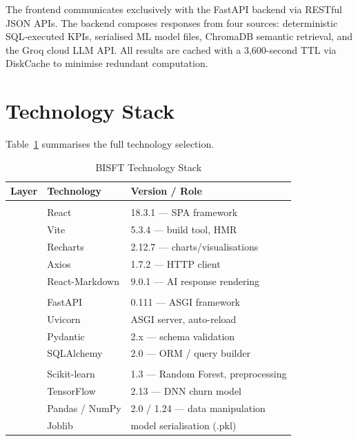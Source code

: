 \documentclass[conference]{IEEEtran}
\begin{document}
The frontend communicates exclusively with the FastAPI backend via RESTful JSON APIs.
The backend composes responses from four sources: deterministic SQL-executed KPIs,
serialised ML model files, ChromaDB semantic retrieval, and the Groq cloud LLM API.
All results are cached with a 3{,}600-second TTL via DiskCache to minimise redundant
computation.

\section{Technology Stack}

Table~\ref{tab:tech} summarises the full technology selection.

\begin{table}[H]
\centering
\caption{BISFT Technology Stack}
\label{tab:tech}
\scriptsize
\setlength{\tabcolsep}{4pt}
\begin{tabularx}{\linewidth}{@{}l l X@{}}
\toprule
\textbf{Layer} & \textbf{Technology} & \textbf{Version / Role} \\
\midrule
\rowcolor{rowgray}
\multicolumn{3}{l}{\textit{Frontend}} \\
& React            & 18.3.1 — SPA framework \\
& Vite             & 5.3.4 — build tool, HMR \\
& Recharts         & 2.12.7 — charts/visualisations \\
& Axios            & 1.7.2 — HTTP client \\
& React-Markdown   & 9.0.1 — AI response rendering \\
\rowcolor{rowgray}
\multicolumn{3}{l}{\textit{Backend}} \\
& FastAPI          & 0.111 — ASGI framework \\
& Uvicorn          & ASGI server, auto-reload \\
& Pydantic         & 2.x — schema validation \\
& SQLAlchemy       & 2.0 — ORM / query builder \\
\rowcolor{rowgray}
\multicolumn{3}{l}{\textit{Machine Learning}} \\
& Scikit-learn     & 1.3 — Random Forest, preprocessing \\
& TensorFlow       & 2.13 — DNN churn model \\
& Pandas / NumPy   & 2.0 / 1.24 — data manipulation \\
& Joblib           & model serialisation (.pkl) \\

\end{tabularx}
\end{table}
\end{document}
